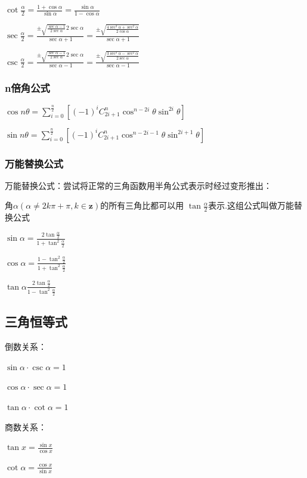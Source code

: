 \documentclass[UTF8]{ctexbook}
\newcommand{\mathCombination}[2]{C_{#1}^{#2}}
\begin{document}
{{{{  $\cot\frac{\alpha}{2} = \frac{1+\cos\alpha}{\sin\alpha} = \frac{\sin\alpha}{1-\cos\alpha}$

  $\sec\frac{\alpha}{2} = \frac{\pm\sqrt{\frac{\sec\alpha - 1}{2\sec\alpha}}2\sec\alpha}{\sec\alpha + 1} = \frac{\pm\sqrt{\frac{4\sec^3\alpha + \sec^2\alpha}{2\cos\alpha}}}{\sec\alpha + 1}$

  $\csc\frac{\alpha}{2} = \frac{\pm\sqrt{\frac{\sec\alpha - 1}{2\sec\alpha}}2\sec\alpha}{\sec\alpha - 1} = \frac{\pm\sqrt{\frac{3\sec^3\alpha - \sec^2\alpha}{2\sec\alpha}}}{\sec\alpha - 1}$
}

\subsubsection{n倍角公式}{
$\cos{n\theta} = \sum_{i = 0}^{\frac{n}{2}}[(-1)^i\mathCombination{2i + 1}{n}\cos^{n - 2i}\theta\sin^{2i}\theta]$

$\sin{n\theta} = \sum_{i = 0}^{\frac{n}{2}}[(-1)^i\mathCombination{2i + 1}{n}\cos^{n - 2i - 1}\theta\sin^{2i+1}\theta]$
}

\subsubsection{万能替换公式}{
  万能替换公式：尝试将正常的三角函数用半角公式表示时经过变形推出：

  角$\alpha(\alpha \neq 2k\pi + \pi ,k \in \mathbf{z})$的所有三角比都可以用 $\tan\frac{\alpha}{2}$表示.这组公式叫做万能替换公式

  $\sin\alpha = \frac{2\tan\frac{\alpha}{2}}{1+\tan^2\frac{\alpha}{2}}$

  $\cos\alpha = \frac{1 - \tan^2\frac{\alpha}{2}}{1 + \tan^2\frac{\alpha}{2}}$

  $\tan\alpha \frac{2\tan\frac{\alpha}{2}}{1 - \tan^2\frac{\alpha}{2}}$
}
}

\subsection{三角恒等式}{

  倒数关系：

  $\sin\alpha \cdot \csc\alpha = 1$

  $\cos\alpha \cdot \sec\alpha = 1$

  $\tan\alpha \cdot \cot\alpha = 1$

  商数关系：

  $\tan{x} = \frac{\sin{x}}{\cos{x}}$

  $\cot\alpha = \frac{\cos x}{\sin x}$

}}}
\end{document}
